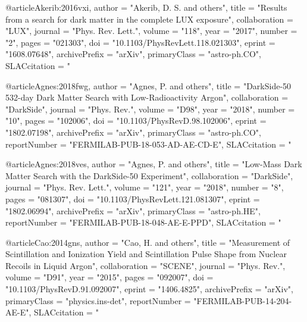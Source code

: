 {{{{{{{{{{{@article{Akerib:2016vxi,
      author         = "Akerib, D. S. and others",
      title          = "{Results from a search for dark matter in the complete
                        LUX exposure}",
      collaboration  = "LUX",
      journal        = "Phys. Rev. Lett.",
      volume         = "118",
      year           = "2017",
      number         = "2",
      pages          = "021303",
      doi            = "10.1103/PhysRevLett.118.021303",
      eprint         = "1608.07648",
      archivePrefix  = "arXiv",
      primaryClass   = "astro-ph.CO",
      SLACcitation   = "%
}

@article{Agnes:2018fwg,
      author         = "Agnes, P. and others",
      title          = "{DarkSide-50 532-day Dark Matter Search with
                        Low-Radioactivity Argon}",
      collaboration  = "DarkSide",
      journal        = "Phys. Rev.",
      volume         = "D98",
      year           = "2018",
      number         = "10",
      pages          = "102006",
      doi            = "10.1103/PhysRevD.98.102006",
      eprint         = "1802.07198",
      archivePrefix  = "arXiv",
      primaryClass   = "astro-ph.CO",
      reportNumber   = "FERMILAB-PUB-18-053-AD-AE-CD-E",
      SLACcitation   = "%
}

@article{Agnes:2018ves,
      author         = "Agnes, P. and others",
      title          = "{Low-Mass Dark Matter Search with the DarkSide-50
                        Experiment}",
      collaboration  = "DarkSide",
      journal        = "Phys. Rev. Lett.",
      volume         = "121",
      year           = "2018",
      number         = "8",
      pages          = "081307",
      doi            = "10.1103/PhysRevLett.121.081307",
      eprint         = "1802.06994",
      archivePrefix  = "arXiv",
      primaryClass   = "astro-ph.HE",
      reportNumber   = "FERMILAB-PUB-18-048-AE-E-PPD",
      SLACcitation   = "%
}


@article{Cao:2014gns,
      author         = "Cao, H. and others",
      title          = "{Measurement of Scintillation and Ionization Yield and
                        Scintillation Pulse Shape from Nuclear Recoils in Liquid
                        Argon}",
      collaboration  = "SCENE",
      journal        = "Phys. Rev.",
      volume         = "D91",
      year           = "2015",
      pages          = "092007",
      doi            = "10.1103/PhysRevD.91.092007",
      eprint         = "1406.4825",
      archivePrefix  = "arXiv",
      primaryClass   = "physics.ins-det",
      reportNumber   = "FERMILAB-PUB-14-204-AE-E",
      SLACcitation   = "%
}


}}}}}}}}}}}
